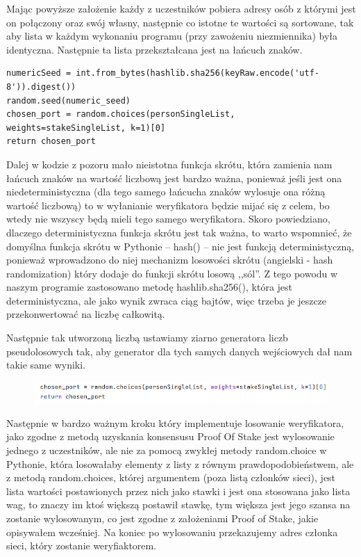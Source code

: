 Mając powyższe założenie każdy z uczestników pobiera adresy osób z którymi jest on połączony oraz swój własny, następnie co istotne te wartości są sortowane, tak aby lista w każdym wykonaniu programu (przy zawożeniu niezmiennika) była identyczna. Następnie ta lista przekształcana jest na łańcuch znaków.
\begin{lstlisting}
numericSeed = int.from_bytes(hashlib.sha256(keyRaw.encode('utf-8')).digest())
random.seed(numeric_seed)
chosen_port = random.choices(personSingleList, weights=stakeSingleList, k=1)[0]
return chosen_port
\end{lstlisting}
Dalej w kodzie z pozoru mało nieistotna funkcja skrótu, która zamienia nam łańcuch znaków na wartość liczbową jest bardzo ważna, ponieważ jeśli jest ona niedeterministyczna (dla tego samego łańcucha znaków wylosuje ona różną wartość liczbową) to w wyłanianie weryfikatora będzie mijać się z celem, bo wtedy nie wszyscy będą mieli tego samego weryfikatora. Skoro powiedziano, dlaczego deterministyczna funkcja skrótu jest tak ważna, to warto wspomnieć, że domyślna funkcja skrótu w Pythonie – hash() – nie jest funkcją deterministyczną, ponieważ wprowadzono do niej mechanizm losowości skrótu (angielski - hash randomization) który dodaje do funkcji skrótu losową ,,sól”. Z tego powodu w naszym programie zastosowano metodę hashlib.sha256(), która jest deterministyczna, ale jako wynik zwraca ciąg bajtów, więc trzeba je jeszcze przekonwertować na liczbę całkowitą.

\vspace{1em}

Następnie tak utworzoną liczbą ustawiamy ziarno generatora liczb pseudolosowych tak, aby generator dla tych samych danych wejściowych dał nam takie same wyniki. 

\begin{figure}[H]
    \centering
    \includegraphics[width=\textwidth]{Images/CodeX10.png}
\end{figure}

Następnie w bardzo ważnym kroku który implementuje losowanie weryfikatora, jako zgodne z metodą uzyskania konsensusu Proof Of Stake jest wylosowanie jednego z uczestników, ale nie za pomocą zwykłej metody random.choice w Pythonie, która losowałaby elementy z listy z równym prawdopodobieństwem, ale z metodą random.choices, której argumentem (poza listą członków sieci), jest lista wartości postawionych przez nich jako stawki i jest ona stosowana jako lista wag, to znaczy im ktoś większą postawił stawkę, tym większa jest jego szansa na zostanie wylosowanym, co jest zgodne z założeniami Proof of Stake, jakie opisywałem wcześniej. Na koniec po wylosowaniu przekazujemy adres członka sieci, który zostanie weryfiaktorem.
